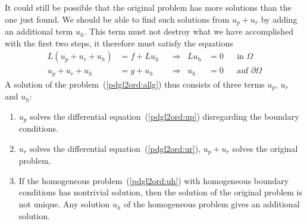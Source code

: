 It could still be possible that the original problem has more solutions
than the one just found.
We should be able to find such solutions from $u_p+u_r$ by adding
an additional term $u_h$.
This term must not destroy what we have accomplished with the first
two steps,
it therefore must satisfy the equations
\begin{equation}
\begin{aligned}
L(u_p+u_r+u_h)&=f+Lu_h&&\Rightarrow&Lu_h&=0&&\text{in $\Omega$}\\
  u_p+u_r+u_h &=g +u_h&&\Rightarrow& u_h&=0&&\text{auf $\partial\Omega$}
\end{aligned}
\label{pdgl2ord:uh}
\end{equation}
A solution of the problem~(\ref{pdgl2ord:allg}) thus consists of three
terms $u_p$, $u_r$ and $u_h$:
\begin{enumerate}
\item
$u_p$ solves the differential equation~(\ref{pdgl2ord:up}) disregarding
the boundary conditions.
\item
$u_r$ solves the differential equation~(\ref{pdgl2ord:ur}),
$u_p+u_r$ solves the original problem.
\item
If the homogeneous problem~(\ref{pdgl2ord:uh}) with homogeneous
boundary conditions has nontrivial solution, then the solution
of the original problem is not unique.
Any solution $u_h$ of the homogeneous problem gives an additional
solution.
\end{enumerate}

